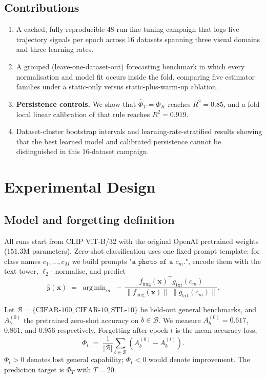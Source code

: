 \documentclass[manuscript,nonacm]{acmart}
\DeclareMathOperator*{\argmin}{arg\,min}
\begin{document}
\subsection{Contributions}
\begin{enumerate}
\item A cached, fully reproducible $48$-run fine-tuning campaign that logs five
      trajectory signals per epoch across $16$ datasets spanning three visual domains
      and three learning rates.
\item A grouped (leave-one-dataset-out) forecasting benchmark in which every
      normalisation and model fit occurs inside the fold, comparing five estimator
      families under a static-only versus static-plus-warm-up ablation.
\item \textbf{Persistence controls.} We show that $\hat\Phi_T=\Phi_K$ reaches
      $R^2=0.85$, and a fold-local linear calibration of that rule reaches
      $R^2=0.919$.
\item Dataset-cluster bootstrap intervals and learning-rate-stratified results showing
      that the best learned model and calibrated persistence cannot be distinguished in
      this $16$-dataset campaign.
\end{enumerate}

\section{Experimental Design}

\subsection{Model and forgetting definition}
All runs start from CLIP ViT-B/32 with the original OpenAI pretrained weights
($151.3$M parameters). Zero-shot classification uses one fixed prompt template: for
class names $c_1,\dots,c_M$ we build prompts
$\texttt{"a photo of a }c_m\texttt{."}$, encode them with the text tower, $\ell_2$-
normalise, and predict
\begin{equation}
\hat{y}(\mathbf{x}) \;=\; \argmin_{m}\; -\,
\frac{f_{\mathrm{img}}(\mathbf{x})^{\!\top} g_{\mathrm{txt}}(c_m)}
     {\lVert f_{\mathrm{img}}(\mathbf{x})\rVert\;\lVert g_{\mathrm{txt}}(c_m)\rVert}.
\label{eq:zeroshot}
\end{equation}

Let $\mathcal{B}=\{\text{CIFAR-100},\text{CIFAR-10},\text{STL-10}\}$ be held-out general
benchmarks, and $A_b^{(0)}$ the pretrained zero-shot accuracy on $b\in\mathcal{B}$. We
measure $A_b^{(0)}=0.617$, $0.861$, and $0.956$ respectively. Forgetting after epoch
$t$ is the mean accuracy loss,
\begin{equation}
\Phi_t \;=\; \frac{1}{|\mathcal{B}|}\sum_{b\in\mathcal{B}}\left(A_b^{(0)}-A_b^{(t)}\right).
\label{eq:forgetting}
\end{equation}
$\Phi_t>0$ denotes lost general capability; $\Phi_t<0$ would denote improvement. The
prediction target is $\Phi_T$ with $T=20$.
\end{document}
